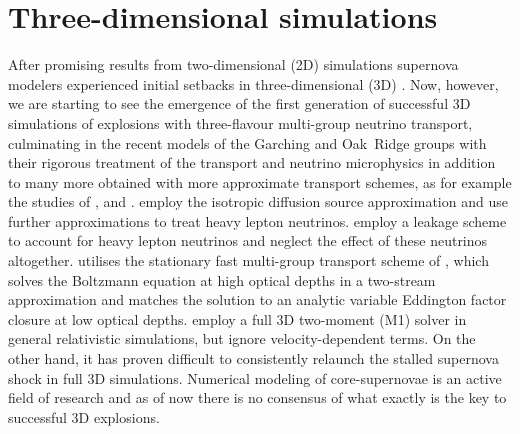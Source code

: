 \section{Three-dimensional simulations}
After promising results from 
two-dimensional (2D) simulations supernova modelers experienced initial setbacks in three-dimensional (3D) \citep{hanke_12,hanke_13}.
Now, however, we are starting to see the emergence of the first generation
of successful 3D simulations of explosions with three-flavour
multi-group neutrino transport, culminating in the recent models
of the Garching and Oak~Ridge groups
\citep{melson_15a,melson_15b,lentz_15} with their rigorous treatment
of the transport and neutrino microphysics in addition to many more
obtained with more approximate transport schemes,
as for example the studies of \citet{takiwaki_12,takiwaki_14}, 
\citet{mueller_15b} and \citet{roberts_16}.
\citet{takiwaki_12,takiwaki_14} employ the isotropic diffusion source 
approximation \citep{liebendoerfer_09}
and use further approximations to treat heavy lepton neutrinos.
\cite{takiwaki_14} employ a leakage scheme to account for heavy lepton
neutrinos and \cite{takiwaki_12} neglect the effect of these neutrinos 
altogether. \cite{mueller_15b} utilises the stationary fast multi-group 
transport scheme of \cite{mueller_15a}, which 
solves the Boltzmann equation at high optical depths in a two-stream approximation and
matches the solution to an analytic variable 
Eddington factor closure at low optical depths.
\citet{roberts_16} employ a full 3D two-moment (M1) solver in 
general relativistic simulations, but ignore velocity-dependent
terms.
On the other hand, it has proven difficult to consistently 
relaunch the stalled supernova shock in full 3D simulations.
Numerical modeling of core-supernovae is an active field of
research and as of now there is no consensus of what exactly 
is the key to successful 3D explosions.

